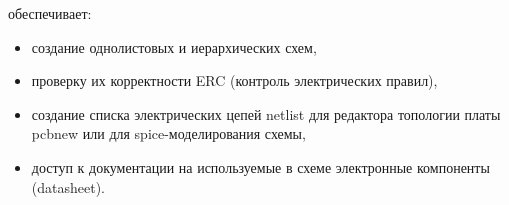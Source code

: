 
\label{eeschema}

обеспечивает:

\begin{itemize}
\item создание однолистовых и иерархических схем,
\item проверку их корректности ERC (контроль электрических правил),
\item создание списка электрических цепей netlist для редактора топологии платы
pcbnew или для spice-моделирования схемы, 
\item доступ к документации на используемые в схеме электронные компоненты
(datasheet).
\end{itemize}
